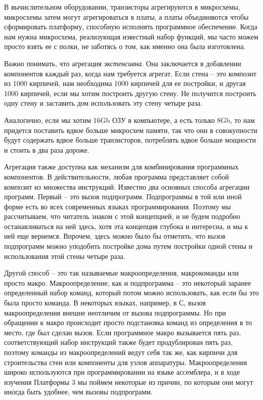 В вычислительном оборудовании, транзисторы агрегируются в микросхемы, микросхемы затем могут агрегироваться в платы, а платы объединяются чтобы сформировать платформу, способную исполнять программное обеспечение.  Когда нам нужна микросхема, реализующая известный набор функций, мы часто можем просто взять ее с полки, не заботясь о том, как именно она была изготовлена.

Важно понимать, что агрегация \emph{экстенсивна}.  Она заключается в добавлении компонентов каждый раз, когда нам требуется агрегат.  Если стена -- это композит из 1000 кирпичей, нам необходима 1000 кирпичей для ее постройки, и другая 1000 кирпичей, если мы хотим построить другую стену.  Не получится построить одну стену и заставить дом использовать эту стену четыре раза.

Аналогично, если мы хотим 16Gb ОЗУ в компьютере, а есть только 8Gb, то нам придется поставить вдвое больше микросхем памяти, так что они в совокупности будут содержать вдвое больше транзисторов, потреблять вдвое больше мощности и стоить в два раза дороже.

Агрегация также доступна как механизм для комбинирования программных компонентов.  В действительности, любая программа представляет собой композит из множества инструкций.  Известно два основных способа агрегации программ.  Первый -- это вызов подпрограмм.  Подпрограммы в той или иной форме есть во всех современных языках программирования. Поэтому мы рассчитываем, что читатель знаком с этой концепцией, и не будем подробно останавливаться на ней здесь, хотя эта концепция глубока и интересна, и мы к ней еще вернемся.  Впрочем, здесь можно было бы отметить, что вызов подпрограмм можно уподобить постройке дома путем постройки одной стены и использования этой стены четыре раза.

Другой способ -- это так называемые макроопределения, макрокоманды или просто макро.  Макроопределение, как и подпрограмма -- это некоторый заранее определенный набор команд, который потом можно использовать, как если бы это была просто команда.  В некоторых языках, например, в С, вызов макроопределения внешне неотличим от вызова подпрограммы.  Но при обращении к макро происходит просто подстановка команд из определения в то место, где был сделан вызов.  Если программное макро вызывается пять раз, соответствующий набор инструкций также будет продублирован пять раз, поэтому команды из макроопределений ведут себя так же, как кирпичи для строительства стен или компоненты для узлов аппаратуры.  Макроопределения широко используются при программировании на языке ассемблера, и в ходе изучения Платформы 3 мы поймем некоторые из причин, по которым они могут иногда быть удобнее, чем вызовы подпрограмм.


